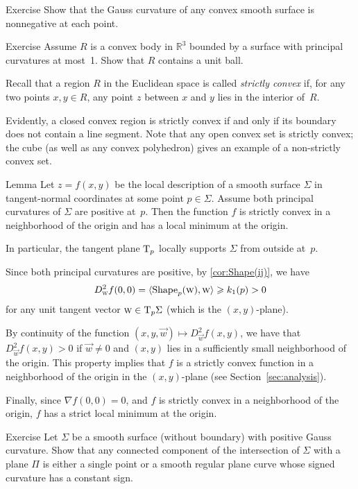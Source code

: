 \begin{thm}{Exercise}\label{ex:convex-surf}
Show that the Gauss curvature of any convex smooth surface is nonnegative at each point.
\end{thm}

\begin{thm}{Exercise}\label{ex:convex-lagunov}
Assume $R$ is a convex body in $\mathbb{R}^3$ bounded by a surface with principal curvatures at most~1.
Show that $R$ contains a unit ball.
\end{thm}

Recall that a region $R$ in the Euclidean space is called  {}\emph{strictly convex} if, for any two points $x,y\in R$, any point $z$ between $x$ and $y$ lies in the interior of~$R$.

Evidently, a closed convex region is strictly convex if and only if its boundary does not contain a line segment.
Note that any open convex set is strictly convex;
the cube (as well as any convex polyhedron) gives an example of a non-strictly convex set.


\begin{thm}{Lemma}\label{lem:gauss+=>convexity}
Let $z=f(x,y)$ be the local description of a smooth surface $\Sigma$ in tangent-normal coordinates at some point $p\in\Sigma$.
Assume both principal curvatures of $\Sigma$ are positive at~$p$.
Then the function $f$ is strictly convex in a neighborhood of the origin and has a local minimum at the origin.

In particular, the tangent plane $\mathrm{T}_p$ locally supports $\Sigma$ from outside at~$p$.
\end{thm}

Since both principal curvatures are positive, by \ref{cor:Shape(ij)}, we have 
\[D^2_{\text{\sc{w}}}f(0,0)=\langle \mathop{\rm Shape}\nolimits_p({\text{\sc{w}}}),{\text{\sc{w}}}\rangle\geqslant k_1(p)>0\] 
for any unit tangent vector ${\text{\sc{w}}}\in\mathrm{T}_p\Sigma$ (which is the $(x,y)$-plane).

By continuity of the function $(x,y,{\vec w})\mapsto D^2_{\vec w}f(x,y)$,
we have that $D^2_{\vec w}f(x,y)>0$ if $\vec w\ne 0$ and $(x,y)$ lies in a sufficiently small neighborhood of the origin.
This property implies that $f$ is a strictly convex function in a neighborhood of the origin in the $(x,y)$-plane (see Section~\ref{sec:analysis}).

Finally, since $\nabla f(0,0)=0$, and $f$ is strictly convex in a neighborhood of the origin, $f$ has a strict local minimum at the origin.
\qeds

\begin{thm}{Exercise}\label{ex:section-of-convex}
Let $\Sigma$ be a smooth surface (without boundary) with positive Gauss curvature.
Show that any connected component of the intersection of $\Sigma$ with a plane $\Pi$ is either a single point or a smooth regular plane curve whose signed curvature has a constant sign.
\end{thm}

